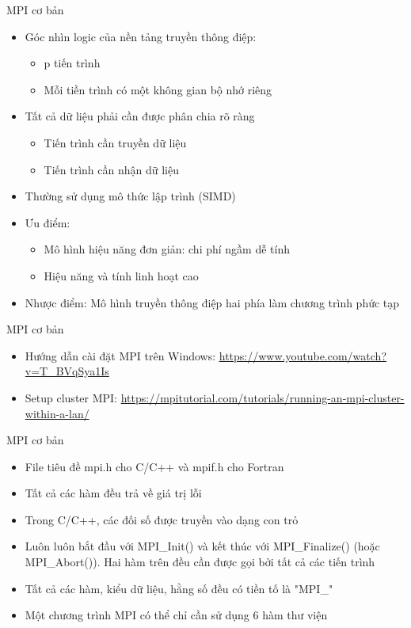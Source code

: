 \documentclass[10pt]{beamer}
\theoremstyle{remark}
\numberwithin{algocf}{section}
\numberwithin{equation}{section}
\numberwithin{dl}{section}
\numberwithin{figure}{section}
\begin{document}
\begin{frame}[shrink]{MPI cơ bản}
    \begin{itemize}
        \item Góc nhìn logic của nền tảng truyền thông điệp:
        \begin{itemize}
            \item p tiến trình
            \item Mỗi tiền trình có một không gian bộ nhớ riêng
        \end{itemize}
        \item Tất cả dữ liệu phải cần được phân chia rõ ràng
        \begin{itemize}
            \item Tiến trình cần truyền dữ liệu
            \item Tiến trình cần nhận dữ liệu
        \end{itemize}
        \item Thường sử dụng mô thức lập trình (SIMD)
        \item Ưu điểm:
        \begin{itemize}
            \item Mô hình hiệu năng đơn giản: chi phí ngầm dễ tính
            \item Hiệu năng và tính linh hoạt cao
        \end{itemize}
        \item Nhược điểm: Mô hình truyền thông điệp hai phía làm chương trình phức tạp
    \end{itemize}
\end{frame}

\begin{frame}{MPI cơ bản}
    \begin{itemize}
        \item Hướng dẫn cài đặt MPI trên Windows: \url{https://www.youtube.com/watch?v=T_BVqSya1Is}
        \item Setup cluster MPI: \url{https://mpitutorial.com/tutorials/running-an-mpi-cluster-within-a-lan/}
    \end{itemize}
\end{frame}

\begin{frame}{MPI cơ bản}
    \begin{itemize}
        \item File tiêu đề mpi.h cho C/C++ và mpif.h cho Fortran
        \item Tất cả các hàm đều trả về giá trị lỗi
        \item Trong C/C++, các đối số được truyền vào dạng con trỏ
        \item Luôn luôn bắt đầu với MPI\_Init() và kết thúc với MPI\_Finalize() (hoặc MPI\_Abort()).
        Hai hàm trên đều cần được gọi bởi tất cả các tiến trình
        \item Tất cả các hàm, kiểu dữ liệu, hằng số đều có tiền tố là "MPI\_"
        \item Một chương trình MPI có thể chỉ cần sử dụng 6 hàm thư viện
    \end{itemize}
\end{frame}
\end{document}

